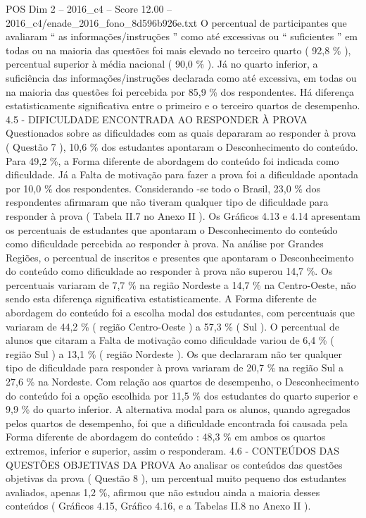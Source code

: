\begin{textsample}{POS Dim 2 – 2016\_c4 – Score 12.00 – 2016\_c4/enade\_2016\_fono\_8d596b926e.txt}
O percentual de participantes que avaliaram “ as informações/instruções ” como até excessivas ou “ suficientes ” em todas ou na maioria das questões foi mais elevado no terceiro quarto ( 92,8 \% ), percentual superior à média nacional ( 90,0 \% ).
Já no quarto inferior, a suficiência das informações/instruções declarada como até excessiva, em todas ou na maioria das questões foi percebida por 85,9 \% dos respondentes.
Há diferença estatisticamente significativa entre o primeiro e o terceiro quartos de desempenho. 4.5 - DIFICULDADE ENCONTRADA AO RESPONDER À PROVA Questionados sobre as dificuldades com as quais depararam ao responder à prova ( Questão 7 ), 10,6 \% dos estudantes apontaram o Desconhecimento do conteúdo.
Para 49,2 \%, a Forma diferente de abordagem do conteúdo foi indicada como dificuldade.
Já a Falta de motivação para fazer a prova foi a dificuldade apontada por 10,0 \% dos respondentes.
Considerando -se todo o Brasil, 23,0 \% dos respondentes afirmaram que não tiveram qualquer tipo de dificuldade para responder à prova ( Tabela II.7 no Anexo II ).
Os Gráficos 4.13 e 4.14 apresentam os percentuais de estudantes que apontaram o Desconhecimento do conteúdo como dificuldade percebida ao responder à prova.
Na análise por Grandes Regiões, o percentual de inscritos e presentes que apontaram o Desconhecimento do conteúdo como dificuldade ao responder à prova não superou 14,7 \%.
Os percentuais variaram de 7,7 \% na região Nordeste a 14,7 \% na Centro-Oeste, não sendo esta diferença significativa estatisticamente.
A Forma diferente de abordagem do conteúdo foi a escolha modal dos estudantes, com percentuais que variaram de 44,2 \% ( região Centro-Oeste ) a 57,3 \% ( Sul ).
O percentual de alunos que citaram a Falta de motivação como dificuldade variou de 6,4 \% ( região Sul ) a 13,1 \% ( região Nordeste ).
Os que declararam não ter qualquer tipo de dificuldade para responder à prova variaram de 20,7 \% na região Sul a 27,6 \% na Nordeste.
Com relação aos quartos de desempenho, o Desconhecimento do conteúdo foi a opção escolhida por 11,5 \% dos estudantes do quarto superior e 9,9 \% do quarto inferior.
A alternativa modal para os alunos, quando agregados pelos quartos de desempenho, foi que a dificuldade encontrada foi causada pela Forma diferente de abordagem do conteúdo : 48,3 \% em ambos os quartos extremos, inferior e superior, assim o responderam. 4.6 - CONTEÚDOS DAS QUESTÕES OBJETIVAS DA PROVA Ao analisar os conteúdos das questões objetivas da prova ( Questão 8 ), um percentual muito pequeno dos estudantes avaliados, apenas 1,2 \%, afirmou que não estudou ainda a maioria desses conteúdos ( Gráficos 4.15, Gráfico 4.16, e a Tabelas II.8 no Anexo II ).

\end{textsample}
